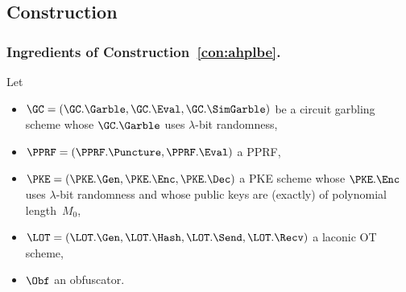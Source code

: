 \subsection{Construction}\label{sec:ahplbe-construction}

\subsubsection{Ingredients of Construction~\ref{con:ahplbe}.}
Let
\begin{itemize}
\item ${\GC=(\GC.\Garble,\GC.\Eval,\GC.\SimGarble)}$ be a circuit garbling scheme
whose $\GC.\Garble$ uses $\lambda$-bit randomness,
\item ${\PPRF=(\PPRF.\Puncture,\PPRF.\Eval)}$ a PPRF,
\item ${\PKE=(\PKE.\Gen,\PKE.\Enc,\PKE.\Dec)}$ a PKE scheme
whose $\PKE.\Enc$ uses $\lambda$-bit randomness and
whose public keys are (exactly) of polynomial length~$M_0$,
\item ${\LOT=(\LOT.\Gen,\LOT.\Hash,\LOT.\Send,\LOT.\Recv)}$ a laconic OT scheme,
\item $\Obf$ an obfuscator.
\end{itemize}

\begin{figure}

\end{figure}

